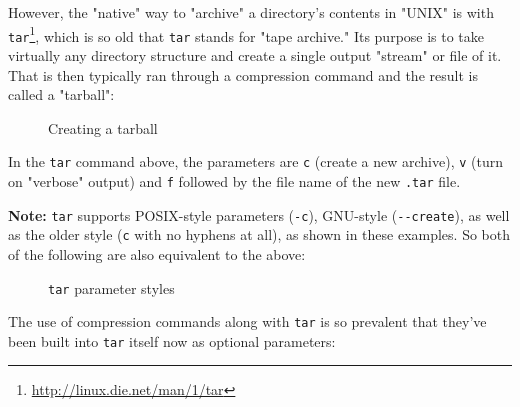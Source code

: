 \documentclass[10pt,american,]{book}
\makeatletter
\newenvironment{Shaded}{\begin{snugshade}}{\end{snugshade}}
\newcommand{\KeywordTok}[1]{\textcolor[rgb]{0.13,0.29,0.53}{\textbf{{#1}}}}
\newcommand{\NormalTok}[1]{{#1}}
\renewcommand{\href}[2]{#2\footnote{\url{#1}}}
\numberwithin{figure}{chapter}
\DeclareRobustCommand{\drcap}[1]{\begin{figure}[H]\caption{#1}\end{figure}}
\DeclareRobustCommand{\drcmd}[1]{
    \index{commands!#1@\texttt{#1}}
}
\renewcommand{\KeywordTok}[1]{{#1}}
\renewcommand{\NormalTok}[1]{{#1}}
\makeatother
\begin{document}
However, the "native" way to "archive" a directory's contents in "UNIX"
is with \href{http://linux.die.net/man/1/tar}{\texttt{tar}}, which is so
old that \texttt{tar} stands for "tape archive." Its purpose is to take
virtually any directory structure and create a single output "stream" or
file of it. That is then typically ran through a compression command and
the result is called a "tarball": \drcmd{tar}

\drcap{Creating a tarball}

\begin{Shaded}
\end{Shaded}

In the \texttt{tar} command above, the parameters are \texttt{c} (create
a new archive), \texttt{v} (turn on "verbose" output) and \texttt{f}
followed by the file name of the new \texttt{.tar} file.

\textbf{Note:} \texttt{tar} supports POSIX-style parameters
(\texttt{-c}), GNU-style (\texttt{-\/-create}), as well as the older
style (\texttt{c} with no hyphens at all), as shown in these examples.
So both of the following are also equivalent to the above:

\drcap{\texttt{tar} parameter styles}

\begin{Shaded}
\end{Shaded}

The use of compression commands along with \texttt{tar} is so prevalent
that they've been built into \texttt{tar} itself now as optional
parameters:
\end{document}
